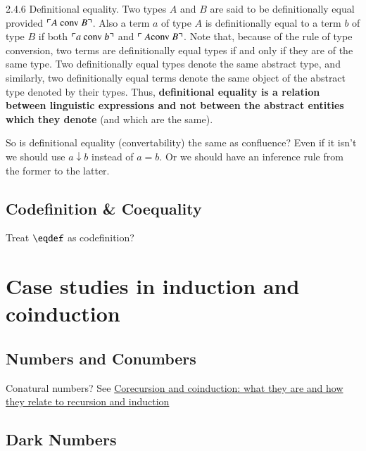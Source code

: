 \documentclass{article}
\begin{document}
\vspace{2ex}

\begin{displayquote} 2.4.6 Definitional equality. Two types \(A\) and \(B\) are
  said to be {\upshape definitionally equal} provided \(\ulcorner
  A\ \text{\upshape conv}\ B\urcorner\). Also a term \(a\) of type
  \(A\) is definitionally equal to a term \(b\) of type \(B\) if both
  \(\ulcorner a\ \text{\upshape conv}\ b\urcorner\) and \(\ulcorner\ A
  \text{\upshape conv}\ B\urcorner\). Note that, because of the rule of type
  conversion, two terms are definitionally equal types if and only if
  they are of the same type. Two definitionally equal types denote the
  same abstract type, and similarly, two definitionally equal terms
  denote the same object of the abstract type denoted by their types.
  Thus, \textbf{definitional equality is a relation between linguistic
    expressions and not between the abstract entities which they
    denote} (and which are the same).
\end{displayquote}

So is definitional equality (convertability) the same as confluence?
Even if it isn't we should use \(a\downarrow b\) instead of \(a = b\).
Or we should have an inference rule from the former to the latter.

\subsection{Codefinition \& Coequality}

Treat \(\defeq\) as codefinition?

\section{Case studies in induction and coinduction}

\subsection{Numbers and Conumbers}

Conatural numbers? See
\href{https://www.cl.cam.ac.uk/archive/mjcg/plans/Coinduction.pdf}{Corecursion
  and coinduction: what they are and how they relate to recursion and
  induction}

\subsection{Dark Numbers}
\end{document}
